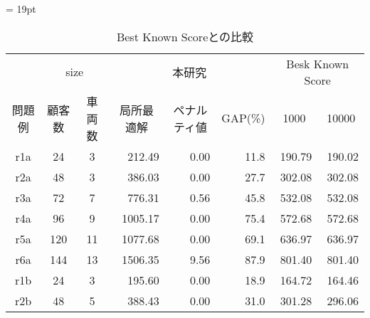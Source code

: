 \begin{landscape}
\begin{table}[]
\tabcolsep = 19pt
\renewcommand{\arraystretch}{0.8}
\caption{Best Known Scoreとの比較}
\label{cordeau}
\begin{tabular}{ccclllll}
\hline
        & \multicolumn{2}{c}{size}                    & \multicolumn{3}{c}{本研究}                                                        & \multicolumn{2}{c}{Besk Known Score}                       \\ \cline{2-8}
問題例     & 顧客数                    & 車両数                   & \multicolumn{1}{c}{局所最適解} & \multicolumn{1}{c}{ペナルティ値} & \multicolumn{1}{c}{GAP(\%)} & \multicolumn{1}{c}{1000} & \multicolumn{1}{c}{10000} \\ \cline{2-8}
r1a     & 24                   & 3                    & \multicolumn{1}{r}{212.49}    & \multicolumn{1}{r}{0.00}     & \multicolumn{1}{r}{11.8}   & \multicolumn{1}{r}{190.79}    & \multicolumn{1}{r}{190.02}     \\
r2a     & 48                   & 3                    & \multicolumn{1}{r}{386.03}    & \multicolumn{1}{r}{0.00}     & \multicolumn{1}{r}{27.7}   & \multicolumn{1}{r}{302.08}    & \multicolumn{1}{r}{302.08}     \\
r3a     & 72                   & 7                   & \multicolumn{1}{r}{776.31}    & \multicolumn{1}{r}{0.56}     & \multicolumn{1}{r}{45.8}   & \multicolumn{1}{r}{532.08}    & \multicolumn{1}{r}{532.08}     \\
r4a     & 96                   & 9                  & \multicolumn{1}{r}{1005.17}    & \multicolumn{1}{r}{0.00}     & \multicolumn{1}{r}{75.4}   & \multicolumn{1}{r}{572.68}    & \multicolumn{1}{r}{572.68}     \\
r5a     & 120                 & 11                   & \multicolumn{1}{r}{1077.68}    & \multicolumn{1}{r}{0.00}     & \multicolumn{1}{r}{69.1}   & \multicolumn{1}{r}{636.97}    & \multicolumn{1}{r}{636.97}     \\
r6a     & 144                  & 13                    & \multicolumn{1}{r}{1506.35}    & \multicolumn{1}{r}{9.56}     & \multicolumn{1}{r}{87.9}   & \multicolumn{1}{r}{801.40}    & \multicolumn{1}{r}{801.40}     \\
r1b    & 24                 & 3                    & \multicolumn{1}{r}{195.60}    & \multicolumn{1}{r}{0.00}     & \multicolumn{1}{r}{18.9}   & \multicolumn{1}{r}{164.72}    & \multicolumn{1}{r}{164.46}     \\
r2b     & 48                 & 5                  & \multicolumn{1}{r}{388.43}    & \multicolumn{1}{r}{0.00}     & \multicolumn{1}{r}{31.0}   & \multicolumn{1}{r}{301.28}    & \multicolumn{1}{r}{296.06}     \\

\end{tabular}
\end{table}
\end{landscape}
